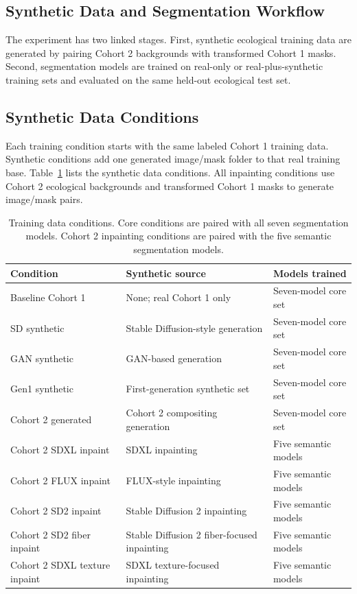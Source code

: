 \documentclass{article}
\begin{document}
\subsection{Synthetic Data and Segmentation Workflow}

The experiment has two linked stages. First, synthetic ecological training data are generated by pairing Cohort 2 backgrounds with transformed Cohort 1 masks. Second, segmentation models are trained on real-only or real-plus-synthetic training sets and evaluated on the same held-out ecological test set.

\subsection{Synthetic Data Conditions}

Each training condition starts with the same labeled Cohort 1 training data. Synthetic conditions add one generated image/mask folder to that real training base. Table~\ref{tab:generation-conditions} lists the synthetic data conditions. All inpainting conditions use Cohort 2 ecological backgrounds and transformed Cohort 1 masks to generate image/mask pairs.

\begin{table}[H]
  \centering
  \caption{Training data conditions. Core conditions are paired with all seven segmentation models. Cohort 2 inpainting conditions are paired with the five semantic segmentation models.}
  \label{tab:generation-conditions}
  \begin{tabular}{lll}
    \toprule
    \textbf{Condition} & \textbf{Synthetic source} & \textbf{Models trained} \\
    \midrule
    Baseline Cohort 1 & None; real Cohort 1 only & Seven-model core set \\
    SD synthetic & Stable Diffusion-style generation & Seven-model core set \\
    GAN synthetic & GAN-based generation & Seven-model core set \\
    Gen1 synthetic & First-generation synthetic set & Seven-model core set \\
    Cohort 2 generated & Cohort 2 compositing generation & Seven-model core set \\
    Cohort 2 SDXL inpaint & SDXL inpainting & Five semantic models \\
    Cohort 2 FLUX inpaint & FLUX-style inpainting & Five semantic models \\
    Cohort 2 SD2 inpaint & Stable Diffusion 2 inpainting & Five semantic models \\
    Cohort 2 SD2 fiber inpaint & Stable Diffusion 2 fiber-focused inpainting & Five semantic models \\
    Cohort 2 SDXL texture inpaint & SDXL texture-focused inpainting & Five semantic models \\
    \bottomrule
  \end{tabular}
\end{table}
\end{document}
